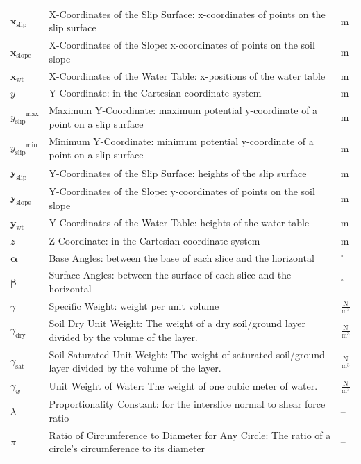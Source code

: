 \documentclass[12pt]{article}
\begin{document}
\begin{longtabu}{l X[l] l}
${\mathbf{x}_{\text{slip}}}$ & X-Coordinates of the Slip Surface: x-coordinates of points on the slip surface & m
\\
${\mathbf{x}_{\text{slope}}}$ & X-Coordinates of the Slope: x-coordinates of points on the soil slope & m
\\
${\mathbf{x}_{\text{wt}}}$ & X-Coordinates of the Water Table: x-positions of the water table & m
\\
$y$ & Y-Coordinate: in the Cartesian coordinate system & m
\\
${{y_{\text{slip}}}^{\text{max}}}$ & Maximum Y-Coordinate: maximum potential y-coordinate of a point on a slip surface & m
\\
${{y_{\text{slip}}}^{\text{min}}}$ & Minimum Y-Coordinate: minimum potential y-coordinate of a point on a slip surface & m
\\
${\mathbf{y}_{\text{slip}}}$ & Y-Coordinates of the Slip Surface: heights of the slip surface & m
\\
${\mathbf{y}_{\text{slope}}}$ & Y-Coordinates of the Slope: y-coordinates of points on the soil slope & m
\\
${\mathbf{y}_{\text{wt}}}$ & Y-Coordinates of the Water Table: heights of the water table & m
\\
$z$ & Z-Coordinate: in the Cartesian coordinate system & m
\\
$\mathbf{α}$ & Base Angles: between the base of each slice and the horizontal & ${}^{\circ}$
\\
$\mathbf{β}$ & Surface Angles: between the surface of each slice and the horizontal & ${}^{\circ}$
\\
$γ$ & Specific Weight: weight per unit volume & $\frac{\text{N}}{\text{m}^{3}}$
\\
${γ_{\text{dry}}}$ & Soil Dry Unit Weight: The weight of a dry soil/ground layer divided by the volume of the layer. & $\frac{\text{N}}{\text{m}^{3}}$
\\
${γ_{\text{sat}}}$ & Soil Saturated Unit Weight: The weight of saturated soil/ground layer divided by the volume of the layer. & $\frac{\text{N}}{\text{m}^{3}}$
\\
${γ_{w}}$ & Unit Weight of Water: The weight of one cubic meter of water. & $\frac{\text{N}}{\text{m}^{3}}$
\\
$λ$ & Proportionality Constant: for the interslice normal to shear force ratio & --
\\
$π$ & Ratio of Circumference to Diameter for Any Circle: The ratio of a circle's circumference to its diameter & --

\end{longtabu}
\end{document}
